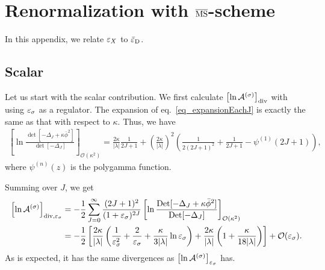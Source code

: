 \documentclass[12pt]{article}
\begin{document}
\section{Renormalization with $\overline{\rm MS}$-scheme}
\label{apx_divpart}
\setcounter{equation}{0}

In this appendix, we relate $\varepsilon_{X}$ to $\bar{\varepsilon}_{\rm D}$.

\subsection{Scalar}

Let us start with the scalar contribution. We first calculate
$\left[\ln\mathcal A^{(\sigma)}\right]_{{\rm div}}$ with using
$\varepsilon_{\sigma}$ as a regulator. The expansion of
eq.~\eqref{eq_expansionEachJ} is exactly the same as that with respect
to $\kappa$. Thus, we have
\begin{align}
 \left[
  \ln\frac{\det[-\Delta_J+\kappa\bar\phi^2]}{\det[-\Delta_J]}
 \right]_{\mathcal O(\kappa^2)}
 =\frac{2\kappa}{|\lambda|}\frac{1}{2J+1}+
 \left(
  \frac{2\kappa}{|\lambda|}
 \right)^2
 \left(
  \frac{1}{2(2J+1)^2}+\frac{1}{2J+1}-\psi^{(1)}(2J+1)
 \right),
\end{align}
where $\psi^{(n)}(z)$ is the polygamma function.

Summing over $J$, we get
\begin{align}
 \left[
  \ln\mathcal A^{(\sigma)}
 \right]_{{\rm div},\varepsilon_{\sigma}}
  & = -\frac{1}{2}\sum_{J=0}^{\infty}\frac{(2J+1)^2}{(1+\varepsilon_{\sigma})^{2J}}
 \left[
  \ln\frac{{\rm Det}[-\Delta_J+\kappa\bar\phi^2]}{{\rm Det}[-\Delta_J]}
 \right]_{\mathcal O(\kappa^2)}\nonumber                                    \\
  & = -\frac{1}{2}
 \left[
  \frac{2\kappa}{|\lambda|}
  \left(
   \frac{1}{\varepsilon_{\sigma}^2}+\frac{2}{\varepsilon_{\sigma}}+\frac{\kappa}{3|\lambda|}\ln\varepsilon_{\sigma}
  \right)+\frac{2\kappa}{|\lambda|}
  \left(
   1+\frac{\kappa}{18|\lambda|}
  \right)
 \right]+\mathcal O(\varepsilon_{\sigma}).
\end{align}
As is expected, it has the same divergences as $\left[\ln\mathcal
 A^{(\sigma)}\right]_{\varepsilon_{\sigma}}$ has.
\end{document}

